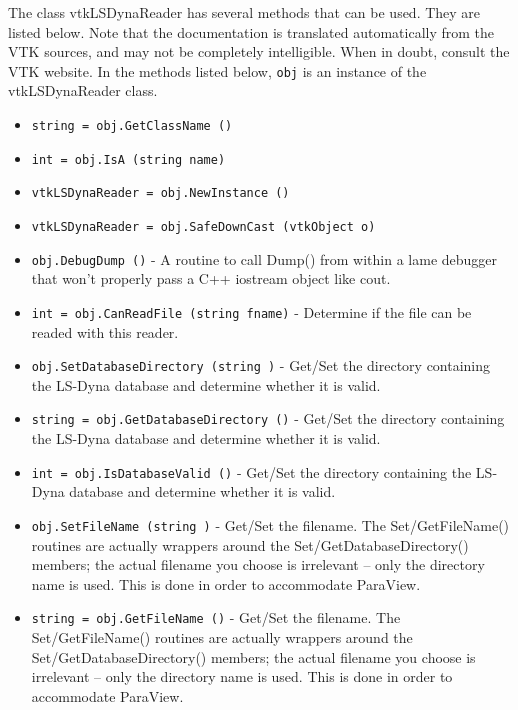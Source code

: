 The class vtkLSDynaReader has several methods that can be used.
  They are listed below.
Note that the documentation is translated automatically from the VTK sources,
and may not be completely intelligible.  When in doubt, consult the VTK website.
In the methods listed below, \verb|obj| is an instance of the vtkLSDynaReader class.
\begin{itemize}
\item  \verb|string = obj.GetClassName ()|

\item  \verb|int = obj.IsA (string name)|

\item  \verb|vtkLSDynaReader = obj.NewInstance ()|

\item  \verb|vtkLSDynaReader = obj.SafeDownCast (vtkObject o)|

\item  \verb|obj.DebugDump ()| -  A routine to call Dump() from within a lame debugger that won't
 properly pass a C++ iostream object like cout.

\item  \verb|int = obj.CanReadFile (string fname)| -  Determine if the file can be readed with this reader.

\item  \verb|obj.SetDatabaseDirectory (string )| -  Get/Set the directory containing the LS-Dyna database and determine
 whether it is valid.

\item  \verb|string = obj.GetDatabaseDirectory ()| -  Get/Set the directory containing the LS-Dyna database and determine
 whether it is valid.

\item  \verb|int = obj.IsDatabaseValid ()| -  Get/Set the directory containing the LS-Dyna database and determine
 whether it is valid.

\item  \verb|obj.SetFileName (string )| -  Get/Set the filename. The Set/GetFileName() routines are actually
 wrappers around the Set/GetDatabaseDirectory() members; the actual
 filename you choose is irrelevant -- only the directory name is used.
 This is done in order to accommodate ParaView.

\item  \verb|string = obj.GetFileName ()| -  Get/Set the filename. The Set/GetFileName() routines are actually
 wrappers around the Set/GetDatabaseDirectory() members; the actual
 filename you choose is irrelevant -- only the directory name is used.
 This is done in order to accommodate ParaView.


\end{itemize}
